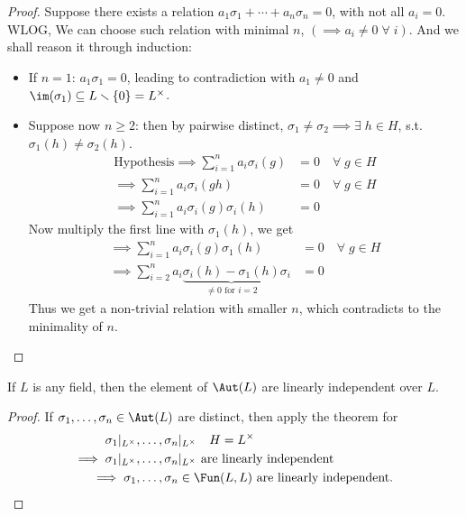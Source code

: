 \begin{proof}
	Suppose there exists a relation \( a_1\sigma_1 + \cdots + a_n \sigma_n = 0 \), with not all \( a_i
	= 0\). WLOG, We can choose such relation with minimal \( n \), \( (\implies a_i \ne 0 \; \forall
	\; i) \). And we shall reason it through induction:
	\begin{itemize}
		\item If \( n = 1 \): \( a_1\sigma_1 = 0 \), leading to contradiction with \( a_1 \ne 0 \) and
		      \( \im(\sigma_1) \subseteq L \smallsetminus \{0\} = L^\times \).
		\item Suppose now \( n \geq 2 \): then by pairwise distinct, \( \sigma_1 \ne \sigma_2 \implies
		      \exists \; h \in H \), s.t. \( \sigma_1 (h) \ne \sigma_2 (h) \).
		      \[
			      \begin{aligned}
				      \text{Hypothesis} \implies \sum_{i=1}^n a_i \sigma_i (g) & = 0 \quad \forall \; g \in H \\
				      \implies \sum_{i=1}^n a_i \sigma_i (gh)                  & = 0 \quad \forall \; g \in H \\
				      \implies \sum_{i=1}^n a_i \sigma_i (g) \sigma_i (h)      & = 0
			      \end{aligned}
		      \]
		      Now multiply the first line with \( \sigma_1(h) \), we get
		      \[
			      \begin{aligned}
				      \implies \sum_{i=1}^n a_i \sigma_i (g) \sigma_1(h)                                                    & = 0 \quad \forall \; g \in H \\
				      \implies \sum_{i=2}^n a_i \underbrace{\sigma_i (h) - \sigma_1(h)}_{\ne 0 \text{ for } i = 2} \sigma_i & = 0
			      \end{aligned}
		      \]
		      Thus we get a non-trivial relation with smaller \( n \), which contradicts to the minimality
		      of \( n \).
	\end{itemize}
\end{proof}

\begin{corollary}
	If \( L \) is any field, then the element of \( \Aut(L) \) are linearly independent over \( L \).
\end{corollary}

\begin{proof}
	If \( \sigma_1,\ldots, \sigma_n \in \Aut(L) \) are distinct, then apply the theorem for
	\[
		\begin{aligned}
			\sigma_1 |_{L^\times} ,          &
			\ldots, \sigma_n |_{L^\times} \quad H = L^\times                                                     \\
			\implies \sigma _1|_{L^\times} , & \ldots,  \sigma_n |_{L^\times} \text{ are linearly independent}
			\\
			\implies \sigma_1,               & \ldots, \sigma _n \in \Fun(L,L) \text{ are linearly independent.}
		\end{aligned}
	\]
\end{proof}

